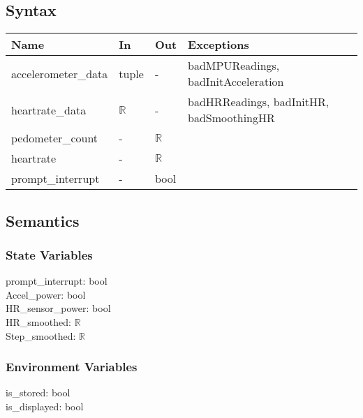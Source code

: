 \documentclass[12pt, titlepage]{article}
\begin{document}
\subsection{Syntax}

\begin{center}
\begin{tabular}{p{4cm} p{2cm} p{2cm} p{4cm}}
\hline
\textbf{Name} & \textbf{In} & \textbf{Out} & \textbf{Exceptions} \\
\hline
accelerometer\_data & tuple & - & badMPUReadings, badInitAcceleration \\ %
heartrate\_data & $\mathbb{R}$ & - & badHRReadings, badInitHR, badSmoothingHR \\
pedometer\_count & - & $\mathbb{R}$ & \\
heartrate & - & $\mathbb{R}$ & \\
prompt\_interrupt & - & bool & \\ %

\hline
\end{tabular}
\end{center}

\subsection{Semantics}

\subsubsection{State Variables}

prompt\_interrupt: bool \\
Accel\_power: bool \\
HR\_sensor\_power: bool \\ %
HR\_smoothed: $\mathbb{R}$ \\
Step\_smoothed: $\mathbb{R}$ \\


\subsubsection{Environment Variables}

is\_stored: bool \\
is\_displayed: bool \\
\end{document}
